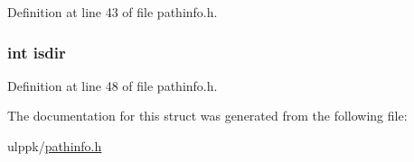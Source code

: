 Definition at line 43 of file pathinfo.\-h.

\hypertarget{struct___p_a_t_h_i_n_f_o___s_t_r_u_c_t_af7391c3fa687229b8224961193e61b0d}{
\subsubsection[{isdir}]{\setlength{\rightskip}{0pt plus 5cm}int isdir}}\label{struct___p_a_t_h_i_n_f_o___s_t_r_u_c_t_af7391c3fa687229b8224961193e61b0d}


Definition at line 48 of file pathinfo.\-h.



The documentation for this struct was generated from the following file\-:\begin{DoxyCompactItemize}
\item 
ulppk/\hyperlink{pathinfo_8h}{pathinfo.\-h}\end{DoxyCompactItemize}
